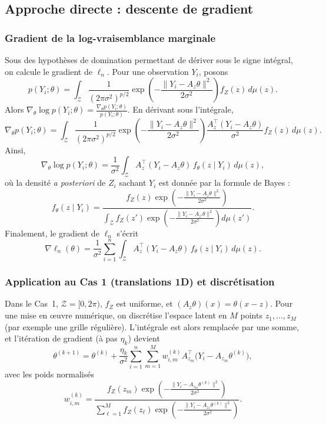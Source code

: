 \documentclass[12pt, a4paper]{article}
\theoremstyle{definition}
\begin{document}
\subsection{Approche directe : descente de gradient}
\label{subsec:gradient}

\subsubsection{Gradient de la log-vraisemblance marginale}

Sous des hypothèses de domination permettant de dériver sous le signe intégral, on calcule le gradient de $\ell_n$. Pour une observation $Y_i$, posons
\[
p(Y_i;\theta) = \int_{\mathcal{Z}} \frac{1}{(2\pi\sigma^2)^{p/2}} \exp\!\left( -\frac{\|Y_i-A_z\theta\|^2}{2\sigma^2} \right) f_Z(z)\,d\mu(z).
\]
Alors $\nabla_\theta \log p(Y_i;\theta) = \frac{\nabla_\theta p(Y_i;\theta)}{p(Y_i;\theta)}$. En dérivant sous l'intégrale,
\[
\nabla_\theta p(Y_i;\theta) = \int_{\mathcal{Z}} \frac{1}{(2\pi\sigma^2)^{p/2}} \exp\!\left( -\frac{\|Y_i-A_z\theta\|^2}{2\sigma^2} \right) \frac{A_z^\top (Y_i-A_z\theta)}{\sigma^2} f_Z(z)\,d\mu(z).
\]
Ainsi,
\[
\nabla_\theta \log p(Y_i;\theta) = \frac{1}{\sigma^2} \int_{\mathcal{Z}} A_z^\top (Y_i-A_z\theta) \, f_\theta(z\mid Y_i)\,d\mu(z),
\]
où la densité \textit{a posteriori} de $Z_i$ sachant $Y_i$ est donnée par la formule de Bayes :
\[
f_\theta(z\mid Y_i) = \frac{ f_Z(z) \exp\!\left( -\frac{\|Y_i-A_z\theta\|^2}{2\sigma^2} \right) }{ \int_{\mathcal{Z}} f_Z(z') \exp\!\left( -\frac{\|Y_i-A_{z'}\theta\|^2}{2\sigma^2} \right) d\mu(z') }.
\]
Finalement, le gradient de $\ell_n$ s'écrit
\[
\boxed{ \nabla \ell_n(\theta) = \frac{1}{\sigma^2} \sum_{i=1}^n \int_{\mathcal{Z}} A_z^\top (Y_i-A_z\theta) \, f_\theta(z\mid Y_i)\,d\mu(z) }.
\]

\subsubsection{Application au Cas 1 (translations 1D) et discrétisation}

Dans le Cas~1, $\mathcal{Z}=[0,2\pi)$, $f_Z$ est uniforme, et $(A_z\theta)(x)=\theta(x-z)$.  
Pour une mise en œuvre numérique, on discrétise l'espace latent en $M$ points $z_1,\dots,z_M$ (par exemple une grille régulière). L'intégrale est alors remplacée par une somme, et l'itération de gradient (à pas $\eta_k$) devient
\[
\theta^{(k+1)} = \theta^{(k)} + \frac{\eta_k}{\sigma^2} \sum_{i=1}^n \sum_{m=1}^M w_{i,m}^{(k)} A_{z_m}^\top \bigl( Y_i - A_{z_m}\theta^{(k)} \bigr),
\]
avec les poids normalisés
\[
w_{i,m}^{(k)} = \frac{ f_Z(z_m) \exp\!\left( -\frac{\|Y_i - A_{z_m}\theta^{(k)}\|^2}{2\sigma^2} \right) }{ \sum_{\ell=1}^M f_Z(z_\ell) \exp\!\left( -\frac{\|Y_i - A_{z_\ell}\theta^{(k)}\|^2}{2\sigma^2} \right) }.
\]
\end{document}

